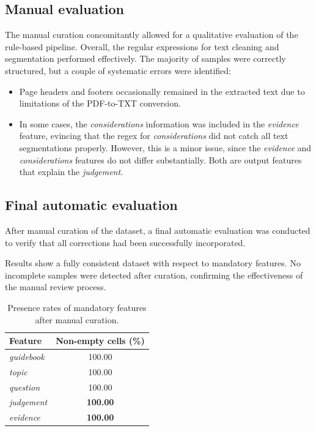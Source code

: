 \documentclass[11pt,a4paper]{article}
\begin{document}
\subsection{Manual evaluation}

The manual curation concomitantly allowed for a qualitative evaluation of the rule-based pipeline. Overall, the regular expressions for text cleaning and segmentation performed effectively. The majority of samples were correctly structured, but a couple of systematic errors were identified:

\begin{itemize}
    \item Page headers and footers occasionally remained in the extracted text due to limitations of the PDF-to-TXT conversion.
    \item In some cases, the \textit{considerations} information was included in the \textit{evidence} feature, evincing that the regex for \textit{considerations} did not catch all text segmentations properly. However, this is a minor issue, since the \textit{evidence} and \textit{considerations} features do not differ substantially. Both are output features that explain the \textit{judgement}.
\end{itemize}



\subsection{Final automatic evaluation}

After manual curation of the dataset, a final automatic evaluation was conducted to verify that all corrections had been successfully incorporated.

Results show a fully consistent dataset with respect to mandatory features. No incomplete samples were detected after curation, confirming the effectiveness of the manual review process.

\begin{table}[H]
\centering
\begin{tabular}{lc}
\toprule
\textbf{Feature} & \textbf{Non-empty cells (\%)} \\
\midrule
\textit{guidebook} & 100.00 \\
\textit{topic} & 100.00 \\
\textit{question} & 100.00 \\
\textit{judgement} & \textbf{100.00} \\
\textit{evidence} & \textbf{100.00} \\
\bottomrule
\end{tabular}
\caption{Presence rates of mandatory features after manual curation.}
\label{tab:final_completeness}
\end{table}
\end{document}
